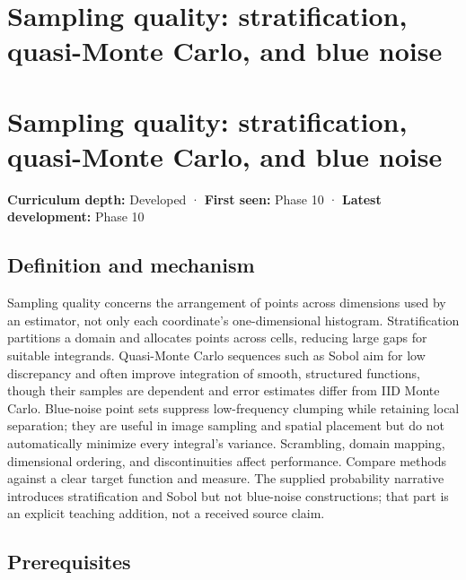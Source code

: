 \hypertarget{appendix-9f693ffd82bc}{}
\section*{Sampling quality: stratification, quasi-Monte Carlo, and blue noise}
\section{Sampling quality: stratification, quasi-Monte Carlo, and blue noise}\label{sampling-quality-stratification-quasi-monte-carlo-and-blue-noise}

\textbf{Curriculum depth:} Developed · \textbf{First seen:} Phase 10 · \textbf{Latest development:} Phase 10

\subsection{Definition and mechanism}\label{definition-and-mechanism}

Sampling quality concerns the arrangement of points across dimensions used by an estimator, not only each coordinate's one-dimensional histogram. Stratification partitions a domain and allocates points across cells, reducing large gaps for suitable integrands. Quasi-Monte Carlo sequences such as Sobol aim for low discrepancy and often improve integration of smooth, structured functions, though their samples are dependent and error estimates differ from IID Monte Carlo. Blue-noise point sets suppress low-frequency clumping while retaining local separation; they are useful in image sampling and spatial placement but do not automatically minimize every integral's variance. Scrambling, domain mapping, dimensional ordering, and discontinuities affect performance. Compare methods against a clear target function and measure. The supplied probability narrative introduces stratification and Sobol but not blue-noise constructions; that part is an explicit teaching addition, not a received source claim.

\subsection{Prerequisites}\label{prerequisites}

